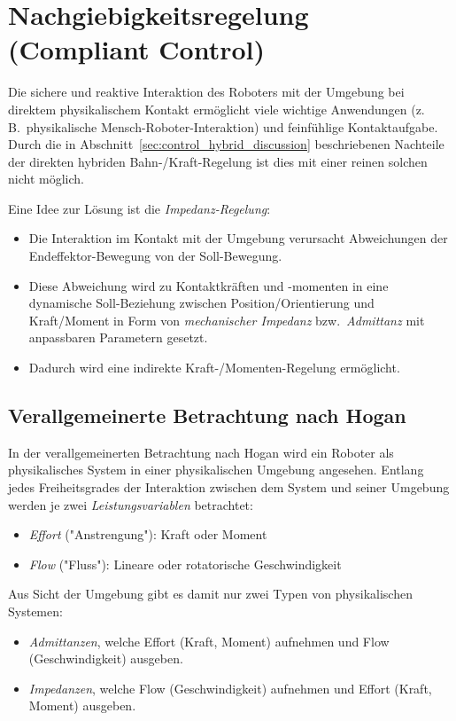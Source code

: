 \documentclass[a4paper, 11pt, accentcolor = tud3b]{tudreport}
\newcommand{\bzw}{bzw.~}
\newcommand{\zB}{z.\,B.~}
\begin{document}
		\section{Nachgiebigkeitsregelung (Compliant Control)}
			Die sichere und reaktive Interaktion des Roboters mit der Umgebung bei direktem physikalischem Kontakt ermöglicht viele wichtige Anwendungen (\zB physikalische Mensch-Roboter-Interaktion) und feinfühlige Kontaktaufgabe. Durch die in Abschnitt~\ref{sec:control_hybrid_discussion} beschriebenen Nachteile der direkten hybriden Bahn-/Kraft-Regelung ist dies mit einer reinen solchen nicht möglich.
			
			Eine Idee zur Lösung ist die \emph{Impedanz-Regelung}:
			\begin{itemize}
				\item Die Interaktion im Kontakt mit der Umgebung verursacht Abweichungen der Endeffektor-Bewegung von der Soll-Bewegung.
				\item Diese Abweichung wird zu Kontaktkräften und -momenten in eine dynamische Soll-Beziehung zwischen Position/Orientierung und Kraft/Moment in Form von \emph{mechanischer Impedanz} \bzw \emph{Admittanz} mit anpassbaren Parametern gesetzt.
				\item Dadurch wird eine indirekte Kraft-/Momenten-Regelung ermöglicht.
			\end{itemize}

			\subsection{Verallgemeinerte Betrachtung nach Hogan}
				In der verallgemeinerten Betrachtung nach Hogan wird ein Roboter als physikalisches System in einer physikalischen Umgebung angesehen. Entlang jedes Freiheitsgrades der Interaktion zwischen dem System und seiner Umgebung werden je zwei \emph{Leistungsvariablen} betrachtet:
				\begin{itemize}
					\item \emph{Effort} ("Anstrengung"): Kraft oder Moment
					\item \emph{Flow} ("Fluss"): Lineare oder rotatorische Geschwindigkeit
				\end{itemize}
				Aus Sicht der Umgebung gibt es damit nur zwei Typen von physikalischen Systemen:
				\begin{itemize}
					\item \emph{Admittanzen}, welche Effort (Kraft, Moment) aufnehmen und Flow (Geschwindigkeit) ausgeben.
					\item \emph{Impedanzen}, welche Flow (Geschwindigkeit) aufnehmen und Effort (Kraft, Moment) ausgeben.
				\end{itemize}
			
\end{document}
